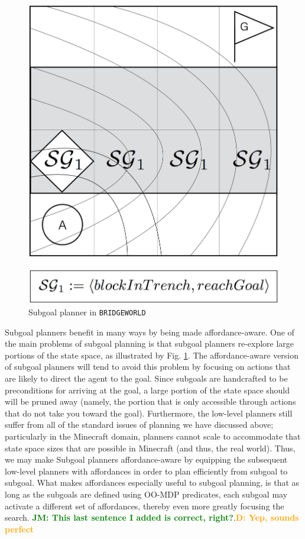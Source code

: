 \documentclass[]{article}
\newcommand{\jmnote}[1]{\textcolor{Green}{\textbf{JM: #1}}}
\newcommand{\dnote}[1]{\textcolor{Orange}{\textbf{D: #1}}}
\begin{document}
\begin{figure}
\centering
\includegraphics[scale=0.22]{figures/bridgeworld_sg.png}
\caption{Subgoal planner in \texttt{BRIDGEWORLD}}
\label{fig:bwsg}
\end{figure}

Subgoal planners benefit in many ways by being made affordance-aware.
One of the main problems of subgoal planning is that subgoal planners
re-explore large portions of the state space, as illustrated by Fig. \ref{fig:bwsg}. The
affordance-aware version of subgoal planners will tend to avoid this problem by focusing
on actions that are likely to direct the agent to the goal. Since subgoals are handcrafted to be
preconditions for arriving at the goal, a large portion of the state space should will be pruned away
(namely, the portion that is only accessible through actions that do not take you toward the goal). 
Furthermore, the low-level planners still suffer from all of the standard issues of planning we have discussed above; 
particularly in the Minecraft domain, planners cannot scale to accommodate that
state space sizes that are possible in Minecraft (and thus, the real world). Thus, we may make Subgoal planners
affordance-aware by equipping the subsequent low-level planners with affordances in
order to plan efficiently from subgoal to subgoal. What makes affordances especially useful to subgoal planning, is that as long as the subgoals are
defined using OO-MDP predicates, each subgoal may activate a different set of affordances, thereby even more greatly focusing the search. \jmnote{This last sentence I added is correct, right?}.\dnote{Yep, sounds perfect}
\end{document}

